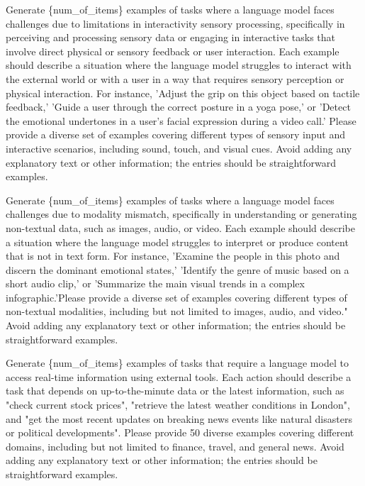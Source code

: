 \begin{tcolorbox}[prompt, title=Metadata Generation For Interactivity Sensory Processing]
Generate \{num\_of\_items\} examples of tasks where a language model faces challenges due to limitations in interactivity sensory processing, specifically in perceiving and processing sensory data or engaging in interactive tasks that involve direct physical or sensory feedback or user interaction. Each example should describe a situation where the language model struggles to interact with the external world or with a user in a way that requires sensory perception or physical interaction. For instance, 'Adjust the grip on this object based on tactile feedback,' 'Guide a user through the correct posture in a yoga pose,' or 'Detect the emotional undertones in a user's facial expression during a video call.' Please provide a diverse set of examples covering different types of sensory input and interactive scenarios, including sound, touch, and visual cues. Avoid adding any explanatory text or other information; the entries should be straightforward examples.\\
\end{tcolorbox}

\begin{tcolorbox}[prompt, title=Metadata Generation For Modality Mismatch]
Generate \{num\_of\_items\} examples of tasks where a language model faces challenges due to modality mismatch, specifically in understanding or generating non-textual data, such as images, audio, or video. Each example should describe a situation where the language model struggles to interpret or produce content that is not in text form. For instance, 'Examine the people in this photo and discern the dominant emotional states,' 'Identify the genre of music based on a short audio clip,' or 'Summarize the main visual trends in a complex infographic.'Please provide a diverse set of examples covering different types of non-textual modalities, including but not limited to images, audio, and video." Avoid adding any explanatory text or other information; the entries should be straightforward examples.
\end{tcolorbox}

\begin{tcolorbox}[prompt, title=Metadata Generation For Latest Information with External Services]
Generate \{num\_of\_items\} examples of tasks that require a language model to access real-time information using external tools. Each action should describe a task that depends on up-to-the-minute data or the latest information, such as "check current stock prices", "retrieve the latest weather conditions in London", and "get the most recent updates on breaking news events like natural disasters or political developments". Please provide 50 diverse examples covering different domains, including but not limited to finance, travel, and general news. Avoid adding any explanatory text or other information; the entries should be straightforward examples.
\end{tcolorbox}

